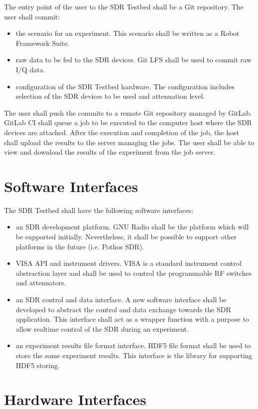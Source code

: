 \documentclass[english,titlepage,a4paper]{report}
\begin{document}
The entry point of the user to the SDR Testbed shall be a Git repository.
The user shall commit:
\begin{itemize}
\item the scenario for an experiment.
  This scenario shall be written as a Robot Framework Suite.
\item raw data to be fed to the SDR devices.
  Git LFS shall be used to commit raw I/Q data.
\item configuration of the SDR Testbed hardware.
  The configuration includes selection of the SDR devices to be used and attenuation level.
\end{itemize}
The user shall push the commits to a remote Git repository managed by GitLab.
GitLab CI shall queue a job to be executed to the computer host where the SDR devices are attached.
After the execution and completion of the job, the host shall upload the results to the server managing the jobs.
The user shall be able to view and download the results of the experiment from the job server.

\section{Software Interfaces}

The SDR Testbed shall have the following software interfaces:
\begin{itemize}
\item an SDR development platform.
  GNU Radio shall be the platform which will be supported initially.
  Nevertheless, it shall be possible to support other platforms in the future (i.e. Pothos SDR).
\item VISA API and instrument drivers.
  VISA is a standard instrument control abstraction layer and shall be used to control the programmable RF switches and attenuators.
\item an SDR control and data interface.
  A new software interface shall be developed to abstract the control and data exchange towards the SDR application.
  This interface shall act as a wrapper function with a purpose to allow realtime control of the SDR during an experiment.
\item an experiment results file format interface.
  HDF5 file format shall be used to store the some experiment results.
  This interface is the library for supporting HDF5 storing.
\end{itemize}

\section{Hardware Interfaces}
\end{document}
